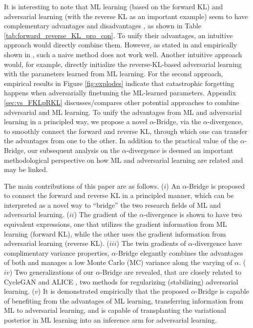 \documentclass[letterpaper]{article} %
\begin{document}
It is interesting to note that ML learning (based on the forward KL) and adversarial learning (with the reverse KL as an important example) seem to have complementary advantages and disadvantages \cite{nguyen2017dual}, as shown in Table \ref{tab:forward_reverse_KL_pro_con}.
To unify their advantages, an intuitive approach would directly combine them. However, as stated in \cite{larsen2015autoencoding,mathieu2016disentangling} and empirically shown in \cite{zhang2019training}, such a naive method does not work well.
Another intuitive approach would, for example, directly initialize the reverse-KL-based adversarial learning with the parameters learned from ML learning. 
For the second approach, empirical results in Figure \ref{fig:explodes} indicate that catastrophic forgetting \cite{kirkpatrick2017overcoming,liang2018generative} happens when adversarially finetuning the ML-learned parameters.
Appendix \ref{sec:vs_FKLpRKL} 
discusses/compares other potential approaches to combine adversarial and ML learning. 
To unify the advantages from ML and adversarial learning in a principled way, we propose a novel $\alpha$-Bridge, via the $\alpha$-divergence, to smoothly connect the forward and reverse KL, through which one can transfer the advantages from one to the other. 
In addition to the practical value of the $\alpha$-Bridge, our subsequent analysis on the $\alpha$-divergence is deemed an important methodological perspective on how ML and adversarial learning are related and may be linked.


The main contributions of this paper are as follows.
($i$) An $\alpha$-Bridge is proposed to connect the forward and reverse KL in a principled manner, which can be interpreted as a novel way to ``bridge'' the two research fields of ML and adversarial learning.
($ii$) The gradient of the $\alpha$-divergence is shown to have two equivalent expressions, one that utilizes the gradient information from ML learning (forward KL), while the other uses the gradient information from adversarial learning (reverse KL). 
($iii$) The twin gradients of $\alpha$-divergence have complimentary variance properties, $\alpha$-Bridge elegantly combines the advantages of both and manages a low Monte Carlo (MC) variance along the varying of $\alpha$.
($iv$) Two generalizations of our $\alpha$-Bridge are revealed, that are closely related to CycleGAN \cite{zhu2017unpaired} and ALICE \cite{li2017alice}, two methods for regularizing (stabilizing) adversarial learning.
($v$) It is demonstrated empirically that the proposed $\alpha$-Bridge is capable of benefiting from the advantages of ML learning, 
transferring information from ML to adversarial learning, and is capable of transplanting the variational posterior in ML learning into an inference arm for adversarial learning.
\end{document}
